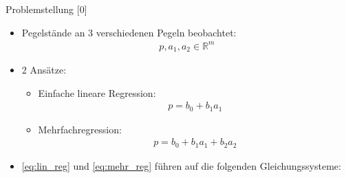\documentclass{beamer}
\begin{document}
\begin{frame}{Problemstellung [0]}
\begin{itemize}
\item Pegelstände an 3 verschiedenen Pegeln beobachtet:
\begin{align}
p, a_1, a_2 \in \mathbb{R}^m
\end{align}
\item 2 Ansätze:
\begin{itemize}
\item Einfache lineare Regression:
\begin{align}
p =b_0+b_1a_1
\label{eq:lin_reg}
\end{align}
\item Mehrfachregression:
\begin{align}
p =b_0+b_1a_1+b_2a_2
\label{eq:mehr_reg}
\end{align}
\end{itemize}
\item \eqref{eq:lin_reg} und \eqref{eq:mehr_reg} führen auf die folgenden Gleichungssysteme:
\end{itemize}

\end{frame}
\end{document}
